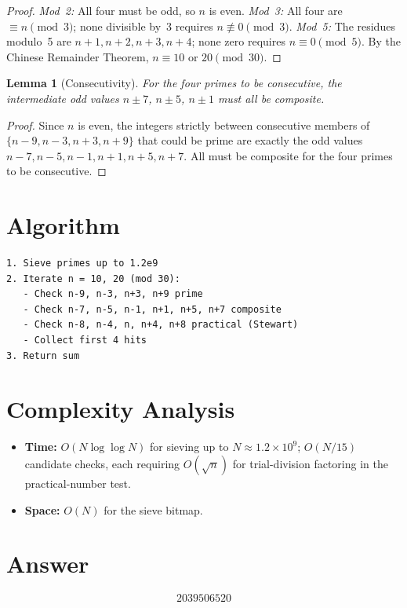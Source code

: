 \documentclass[12pt]{article}
\newtheorem{lemma}[theorem]{Lemma}
\theoremstyle{definition}
\begin{document}
\begin{proof}
\emph{Mod~2:} All four must be odd, so $n$ is even.
\emph{Mod~3:} All four are $\equiv n\pmod{3}$; none divisible by~3 requires $n\not\equiv 0\pmod{3}$.
\emph{Mod~5:} The residues modulo~5 are $n{+}1, n{+}2, n{+}3, n{+}4$; none zero requires $n\equiv 0\pmod{5}$.
By the Chinese Remainder Theorem, $n \equiv 10$ or $20\pmod{30}$.
\end{proof}

\begin{lemma}[Consecutivity]
For the four primes to be consecutive, the intermediate odd values $n \pm 7$, $n \pm 5$, $n \pm 1$ must all be composite.
\end{lemma}

\begin{proof}
Since $n$ is even, the integers strictly between consecutive members of $\{n{-}9, n{-}3, n{+}3, n{+}9\}$ that could be prime are exactly the odd values $n{-}7, n{-}5, n{-}1, n{+}1, n{+}5, n{+}7$. All must be composite for the four primes to be consecutive.
\end{proof}

\section{Algorithm}

\begin{verbatim}
1. Sieve primes up to 1.2e9
2. Iterate n = 10, 20 (mod 30):
   - Check n-9, n-3, n+3, n+9 prime
   - Check n-7, n-5, n-1, n+1, n+5, n+7 composite
   - Check n-8, n-4, n, n+4, n+8 practical (Stewart)
   - Collect first 4 hits
3. Return sum
\end{verbatim}

\section{Complexity Analysis}

\begin{itemize}
\item \textbf{Time:} $O(N\log\log N)$ for sieving up to $N \approx 1.2 \times 10^9$; $O(N/15)$ candidate checks, each requiring $O(\sqrt{n})$ for trial-division factoring in the practical-number test.
\item \textbf{Space:} $O(N)$ for the sieve bitmap.
\end{itemize}

\section{Answer}

\[
\boxed{2039506520}
\]
\end{document}
